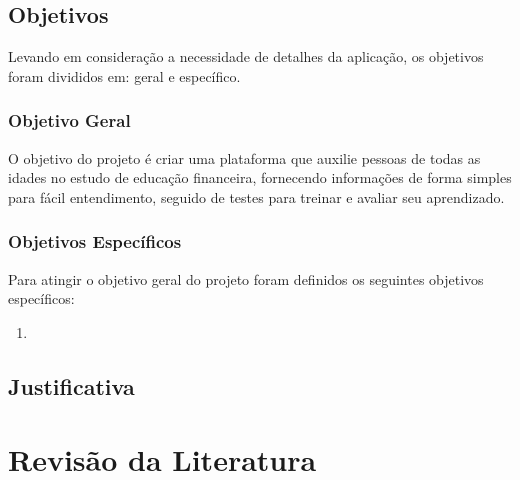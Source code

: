 \documentclass[
	article,			%
	12pt,				%
	oneside,			%
	a4paper,			%
	english,			%
	brazil,				%
	sumario=tradicional
	]{abntex2}
\begin{document}
\subsection{Objetivos}
    Levando em consideração a necessidade de detalhes da aplicação, os objetivos foram divididos em: geral e específico.
\subsubsection{Objetivo Geral}
    O objetivo do projeto é criar uma plataforma que auxilie pessoas de todas as idades no estudo de educação financeira, fornecendo informações de forma simples para fácil entendimento, seguido de testes para treinar e avaliar seu aprendizado.
\subsubsection{Objetivos Específicos}
    Para atingir o objetivo geral do projeto foram definidos os seguintes objetivos específicos:
        \begin{enumerate}[label=\alph*)]
            \item 
        \end{enumerate}
       
\subsection{Justificativa}    

    

\section{Revisão da Literatura}
\end{document}
